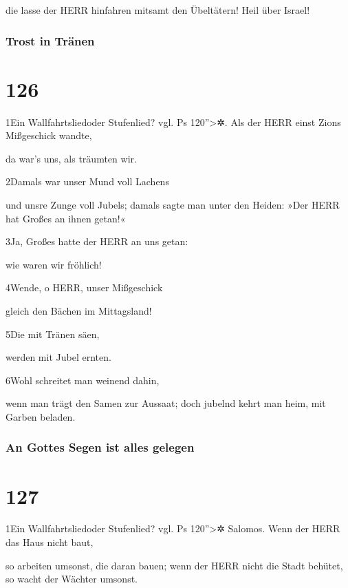 die lasse der HERR hinfahren mitsamt den Übeltätern! Heil über Israel!

\hypertarget{trost-in-truxe4nen}{%
\subsubsection{Trost in Tränen}\label{trost-in-truxe4nen}}

\hypertarget{section-125}{%
\section{126}\label{section-125}}

1Ein Wallfahrtsliedoder Stufenlied? vgl. Ps 120''\textgreater✲. Als der
HERR einst Zions Mißgeschick wandte,

da war's uns, als träumten wir.

2Damals war unser Mund voll Lachens

und unsre Zunge voll Jubels; damals sagte man unter den Heiden: »Der
HERR hat Großes an ihnen getan!«

3Ja, Großes hatte der HERR an uns getan:

wie waren wir fröhlich!

4Wende, o HERR, unser Mißgeschick

gleich den Bächen im Mittagsland!

5Die mit Tränen säen,

werden mit Jubel ernten.

6Wohl schreitet man weinend dahin,

wenn man trägt den Samen zur Aussaat; doch jubelnd kehrt man heim, mit
Garben beladen.

\hypertarget{an-gottes-segen-ist-alles-gelegen}{%
\subsubsection{An Gottes Segen ist alles
gelegen}\label{an-gottes-segen-ist-alles-gelegen}}

\hypertarget{section-126}{%
\section{127}\label{section-126}}

1Ein Wallfahrtsliedoder Stufenlied? vgl. Ps 120''\textgreater✲ Salomos.
Wenn der HERR das Haus nicht baut,

so arbeiten umsonst, die daran bauen; wenn der HERR nicht die Stadt
behütet, so wacht der Wächter umsonst.

